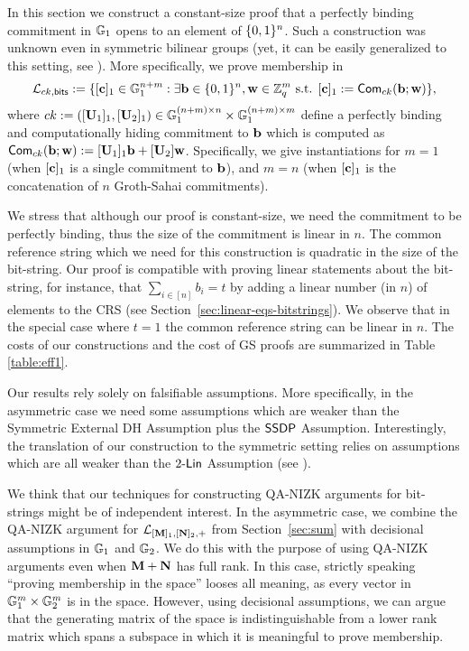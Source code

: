 In this section we construct a constant-size proof that a perfectly binding commitment in $\mathbb{G}_1$ opens to an element of $\{0,1\}^n$.   
Such a construction was unknown even in symmetric bilinear groups (yet, it can be easily generalized to this setting, see  \cite[Appendix C]{EPRINT:GonHevRaf15}).
More specifically, we prove membership in 
$$\mathcal{\mathcal{L}}_{ck,\mathsf{bits}} := 
    \{[\mathbf{c}]_1 \in \mathbb{G}_1^{n+m}: \exists \mathbf{b}\in\{0,1\}^n,\mathbf{w}\in\mathbb{Z}_q^m \text{ s.t. }
        [\mathbf{c}]_1:=  \mathsf{Com}_{ck}(\mathbf{b};\mathbf{w})
    \},$$
 where $ck:=([\mathbf{{U}}_1]_1,[\mathbf{{U}}_2]_1)\in\mathbb{G}_1^{(n+m)\times n}\times\mathbb{G}_1^{(n+m)\times m}$ define a perfectly binding and computationally hiding commitment to $\mathbf{b}$ which is computed as $\mathsf{Com}_{ck}(\mathbf{b};\allowbreak\mathbf{w}):=[\mathbf{{U}}_1]_1\mathbf{b}+[\mathbf{{U}}_2]\mathbf{w}$. Specifically, we give instantiations for $m=1$ (when $[\mathbf{c}]_1$ is a single commitment to $\mathbf{b}$), and $m=n$ (when $[\mathbf{c}]_1$ is the concatenation  of $n$ Groth-Sahai commitments).

We stress that although our proof is constant-size, we need the commitment to be perfectly binding, thus the size of the commitment is linear in $n$.  The common reference string  which we need for this construction is quadratic in the size of the bit-string. Our proof is compatible with proving linear statements about the bit-string, for instance,  
that $\sum_{i \in [n]} b_i=t$ by adding a linear number (in $n$) of elements to the CRS (see Section~\ref{sec:linear-eqs-bitstrings}). We observe that in the special case where $t=1$ the common reference string can be linear in $n$. The costs of our constructions and the cost of GS proofs are summarized in Table \ref{table:eff1}.

Our results rely solely on falsifiable assumptions. More specifically, in the asymmetric case we need some assumptions which are weaker 
than the Symmetric External DH Assumption %
plus the $\mathsf{SSDP}$ Assumption. Interestingly, the translation of our construction to the symmetric setting relies on assumptions which are all weaker than the $2\mbox{-}\mathsf{Lin}$ Assumption (see \cite[Appendix C]{EPRINT:GonHevRaf15}).

We think that our techniques for constructing QA-NIZK arguments for bit-strings might be of independent interest. 
In the asymmetric case, we combine the QA-NIZK argument for $\mathcal{L}_{[\mathbf{{M}}]_1,[\mathbf{{N}}]_2,+}$ from Section~\ref{sec:sum} with decisional assumptions in $\mathbb{G}_1$ and $\mathbb{G}_2$. We do this with the purpose of using QA-NIZK arguments even when $\mathbf{{M}}+\mathbf{{N}}$ has full rank. In this case, strictly speaking ``proving membership in the space'' looses all meaning, as every vector in $\mathbb{G}_1^m\times \mathbb{G}_2^m$ is in the space. However, using decisional assumptions, we can argue that the generating matrix of the space is indistinguishable from a lower rank matrix which spans a subspace in which it is meaningful to prove membership.  

